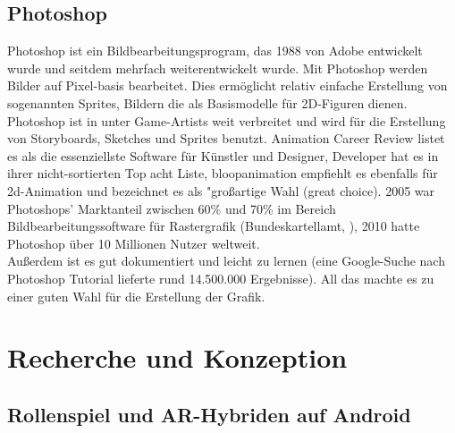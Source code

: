 \documentclass[extern,palatino]{cgBA}
\begin{document}
\subsection{Photoshop}
Photoshop ist ein Bildbearbeitungsprogram, das 1988 von Adobe entwickelt wurde und seitdem mehrfach weiterentwickelt wurde. Mit Photoshop werden Bilder auf Pixel-basis bearbeitet. Dies ermöglicht relativ einfache Erstellung von sogenannten Sprites, Bildern die als Basismodelle für 2D-Figuren dienen.
\\
Photoshop ist in unter Game-Artists weit verbreitet und wird für die Erstellung von Storyboards, Sketches und Sprites benutzt. Animation Career Review listet es als die essenziellste Software für Künstler und Designer, Developer hat es in ihrer nicht-sortierten Top acht Liste, bloopanimation empfiehlt es ebenfalls für 2d-Animation und bezeichnet es als "großartige Wahl (great choice). 2005 war Photoshops' Marktanteil zwischen 60\% und 70\% im Bereich Bildbearbeitungssoftware für Rastergrafik (Bundeskartellamt, %
), 2010 hatte Photoshop über 10 Millionen Nutzer weltweit.
\\
Außerdem ist es gut dokumentiert und leicht zu lernen (eine Google-Suche nach Photoshop Tutorial lieferte rund 14.500.000 Ergebnisse). All das machte es zu einer guten Wahl für die Erstellung der Grafik.
\newpage

\section{Recherche und Konzeption}
\subsection{Rollenspiel und AR-Hybriden auf Android}
\end{document}
